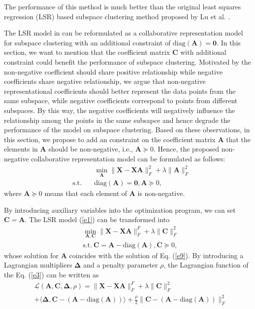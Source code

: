 \documentclass[10pt,twocolumn,letterpaper]{article}
\begin{document}
The performance of this method is much better than the original least squares regression (LSR) based subspace clustering method proposed by Lu et al. \cite{lsr}.

The LSR model in \cite{lsr} can be reformulated as a collaborative representation model \cite{crc} for subspace clustering with an additional constraint of $\text{diag}(\bm{A})=\bm{0}$. In this section, we want to mention that the coefficient matrix $\bm{C}$ with additional constraint could benefit the performance of subspace clustering. Motivated by the non-negative coefficient should share positive relationship while negative coefficients share negative relationship, we argue that non-negative representational coefficients should better represent the data points from the same subspace, while negative coefficients correspond to points from different subspaces. By this way, the negative coefficients will negatively influence the relationship among the points in the same subsapce and hence degrade the performance of the model on subspace clustering. Based on these observations, in this section, we propose to add an constraint on the coefficient matrix $\bm{A}$ that the elements in $\bm{A}$ should be non-negative, i.e., $\bm{A}\succcurlyeq0$. Hence, the proposed non-negative collaborative representation model can be formulated as follows: 
\begin{equation}
\begin{split}
\label{e11}
&
\min_{\bm{A}}
\|
\bm{X}
-
\bm{X}\bm{A}
\|_{F}^{2}
+
\lambda
\|
\bm{A}
\|_{F}^{2}
\\
\quad 
\text{s.t.}
\quad
&
\text{diag}(\bm{A})=\bm{0}
,
\bm{A}\succcurlyeq0
,
\end{split}
\end{equation}
where $\bm{A}\succcurlyeq0$ means that each element of $\bm{A}$ is non-negative.

By introducing auxiliary variables into the optimization program, we can set 
$
\bm{C}
=
\bm{A}
$.
The LSR model (\ref{e1}) can be transformed into
\begin{equation}
\begin{split}
\label{e12}
&
\min_{\bm{A},\bm{C}}
\|
\bm{X}
-
\bm{X}\bm{A}
\|_{F}^{F}
+
\lambda
\|
\bm{C}
\|_{F}^{2}
\\
& 
\text{s.t.}
\ 
\bm{C}=\bm{A}-\text{diag}(\bm{A})
,
\bm{C}\succcurlyeq0
,
\end{split}
\end{equation}
whose solution for $\bm{A}$ coincides with the solution of Eq. (\ref{e9}). By introducing a Lagrangian multipliers $\bm{\Delta}$ and a penalty parameter $\rho$, the Lagrangian function of the Eq. (\ref{e3}) can be written as
\begin{equation}
\begin{split}
\label{e13}
&
\mathcal{L}
(\bm{A},\bm{C},\bm{\Delta},\rho)
=
\|
\bm{X}
-
\bm{X}\bm{A}
\|_{F}^{F}
+
\lambda
\|
\bm{C}
\|_{F}^{2}
\\
&
+
\langle
\bm{\Delta},
\bm{C}-(\bm{A}-\text{diag}(\bm{A}))
\rangle
+
\frac{\rho}{2}
\|
\bm{C}-(\bm{A}-\text{diag}(\bm{A}))
\|_{F}^{2}
\end{split}
\end{equation}
\end{document}
